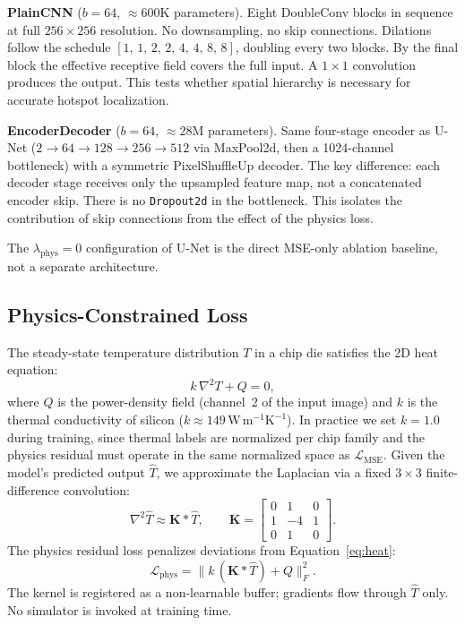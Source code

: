 \documentclass[10pt,twocolumn,letterpaper]{article}
\begin{document}
\textbf{PlainCNN} ($b {=} 64$, ${\approx}600$K parameters).
Eight DoubleConv blocks in sequence at full $256\times256$ resolution. No downsampling,
no skip connections. Dilations follow the schedule $[1,\,1,\,2,\,2,\,4,\,4,\,8,\,8]$,
doubling every two blocks. By the final block the effective receptive field covers the
full input. A $1\times1$ convolution produces the output. This tests whether spatial
hierarchy is necessary for accurate hotspot localization.

\textbf{EncoderDecoder} ($b {=} 64$, ${\approx}28$M parameters).
Same four-stage encoder as U-Net ($2 \to 64 \to 128 \to 256 \to 512$ via MaxPool2d,
then a 1024-channel bottleneck) with a symmetric PixelShuffleUp decoder. The key
difference: each decoder stage receives only the upsampled feature map, not a
concatenated encoder skip. There is no \texttt{Dropout2d} in the bottleneck. This
isolates the contribution of skip connections from the effect of the physics loss.

The $\lambda_\text{phys} {=} 0$ configuration of U-Net is the direct MSE-only ablation
baseline, not a separate architecture.

\subsection{Physics-Constrained Loss}

The steady-state temperature distribution $T$ in a chip die satisfies
the 2D heat equation:
\begin{equation}
  k\,\nabla^2 T + Q = 0,
  \label{eq:heat}
\end{equation}
where $Q$ is the power-density field (channel~2 of the input image)
and $k$ is the thermal conductivity of silicon
($k \approx 149\,\mathrm{W\,m^{-1}K^{-1}}$).
In practice we set $k {=} 1.0$ during training, since thermal labels are normalized
per chip family and the physics residual must operate in the same normalized space
as $\mathcal{L}_\text{MSE}$.
Given the model's predicted
output $\hat{T}$, we approximate the Laplacian via a fixed $3\times3$
finite-difference convolution:
\begin{equation}
  \nabla^2 \hat{T} \approx \mathbf{K} \ast \hat{T},
  \qquad
  \mathbf{K} = \begin{bmatrix}
    0 & 1 & 0 \\ 1 & -4 & 1 \\ 0 & 1 & 0
  \end{bmatrix}.
  \label{eq:laplacian}
\end{equation}
The physics residual loss penalizes deviations from Equation~\ref{eq:heat}:
\begin{equation}
  \mathcal{L}_\text{phys} =
  \bigl\| k\,(\mathbf{K} \ast \hat{T}) + Q \bigr\|_F^2.
  \label{eq:phys_loss}
\end{equation}
The kernel is registered as a non-learnable buffer; gradients flow
through $\hat{T}$ only. No simulator is invoked at training time.
\end{document}
